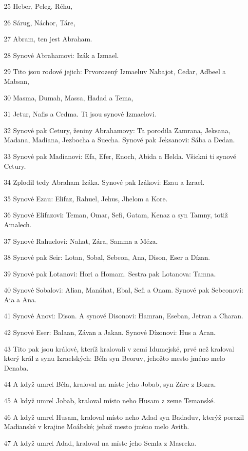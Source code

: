 \par 25 Heber, Peleg, Réhu,
\par 26 Sárug, Náchor, Táre,
\par 27 Abram, ten jest Abraham.
\par 28 Synové Abrahamovi: Izák a Izmael.
\par 29 Tito jsou rodové jejich: Prvorozený Izmaeluv Nabajot, Cedar, Adbeel a Mabsan,
\par 30 Masma, Dumah, Massa, Hadad a Tema,
\par 31 Jetur, Nafis a Cedma. Ti jsou synové Izmaelovi.
\par 32 Synové pak Cetury, ženiny Abrahamovy: Ta porodila Zamrana, Jeksana, Madana, Madiana, Jezbocha a Suecha. Synové pak Jeksanovi: Sába a Dedan.
\par 33 Synové pak Madianovi: Efa, Efer, Enoch, Abida a Helda. Všickni ti synové Cetury.
\par 34 Zplodil tedy Abraham Izáka. Synové pak Izákovi: Ezau a Izrael.
\par 35 Synové Ezau: Elifaz, Rahuel, Jehus, Jhelom a Kore.
\par 36 Synové Elifazovi: Teman, Omar, Sefi, Gatam, Kenaz a syn Tamny, totiž Amalech.
\par 37 Synové Rahuelovi: Nahat, Zára, Samma a Méza.
\par 38 Synové pak Seir: Lotan, Sobal, Sebeon, Ana, Dison, Eser a Dízan.
\par 39 Synové pak Lotanovi: Hori a Homam. Sestra pak Lotanova: Tamna.
\par 40 Synové Sobalovi: Alian, Manáhat, Ebal, Sefi a Onam. Synové pak Sebeonovi: Aia a Ana.
\par 41 Synové Anovi: Dison. A synové Disonovi: Hamran, Eseban, Jetran a Charan.
\par 42 Synové Eser: Balaan, Závan a Jakan. Synové Dízonovi: Hus a Aran.
\par 43 Tito pak jsou králové, kteríž kralovali v zemi Idumejské, prvé než kraloval který král z synu Izraelských: Béla syn Beoruv, jehožto mesto jméno melo Denaba.
\par 44 A když umrel Béla, kraloval na míste jeho Jobab, syn Záre z Bozra.
\par 45 A když umrel Jobab, kraloval místo neho Husam z zeme Temanské.
\par 46 A když umrel Husam, kraloval místo neho Adad syn Badaduv, kterýž porazil Madianské v krajine Moábské; jehož mesto jméno melo Avith.
\par 47 A když umrel Adad, kraloval na míste jeho Semla z Masreka.
